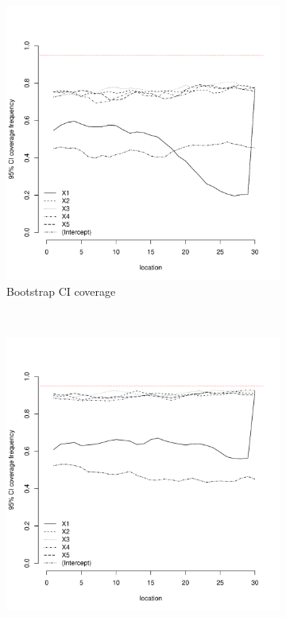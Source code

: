 \documentclass[authoryear, review, 11pt]{elsarticle}
\begin{document}
\begin{figure}
	\vspace{-30mm}
	\centering
	\begin{subfigure}[b]{0.45\textwidth}
	\centering
		\includegraphics[width=\textwidth]{../../figures/simulation/15.10.profile_bootstrap_coverage.pdf}
		\caption{Bootstrap CI coverage}
	\end{subfigure}%
	~ %
	\begin{subfigure}[b]{0.45\textwidth}
	\centering
		\includegraphics[width=\textwidth]{../../figures/simulation/15.10.profile_se_coverage.pdf}

\end{subfigure}
\end{figure}
\end{document}
